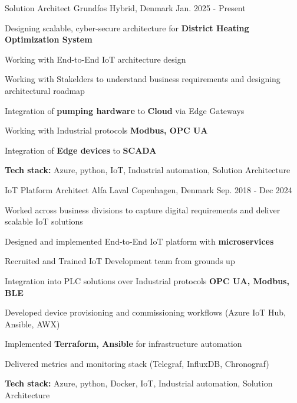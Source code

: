 


\begin{cventries}


\cventry
{Solution Architect} %
{Grundfos} %
{Hybrid, Denmark} %
{Jan. 2025 - Present} %
{ %
\begin{cvitems}
\item Designing scalable, cyber-secure architecture for \textbf{District Heating Optimization System}
\item Working with End-to-End IoT architecture design
\item Working with Stakelders to understand business requirements and designing architectural roadmap
\item Integration of \textbf{pumping hardware} to \textbf{Cloud} via Edge Gateways
\item Working with Industrial protocols \textbf{Modbus, OPC UA}
\item Integration of \textbf{Edge devices} to \textbf{SCADA}
\item \textbf{Tech stack:} Azure, python, IoT, Industrial automation, Solution Architecture
\end{cvitems}
}



\cventry
{IoT Platform Architect} %
{Alfa Laval} %
{Copenhagen, Denmark} %
{Sep. 2018 - Dec 2024} %
{ %
\begin{cvitems}
\item Worked across business divisions to capture digital requirements and deliver scalable IoT solutions
\item Designed and implemented End-to-End IoT platform with \textbf{microservices}
\item Recruited and Trained IoT Development team from grounds up
\item Integration into PLC solutions over Industrial protocols \textbf{OPC UA, Modbus, BLE}
\item Developed device provisioning and commissioning workflows (Azure IoT Hub, Ansible, AWX)
\item Implemented \textbf{Terraform, Ansible} for infrastructure automation
\item Delivered metrics and monitoring stack (Telegraf, InfluxDB, Chronograf)
\item \textbf{Tech stack:} Azure, python, Docker, IoT, Industrial automation, Solution Architecture
\end{cvitems}
}



\end{cventries}

